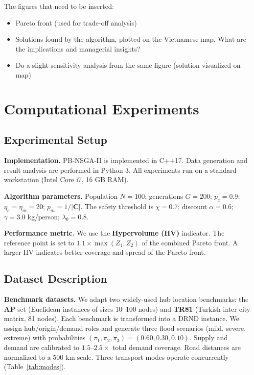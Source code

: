 \documentclass{llncs}
\begin{document}
The figures that need to be inserted:
\begin{itemize}
    \item Pareto front (used for trade-off analysis)
    \item Solutions found by the algorithm, plotted on the Vietnamese map. What are the implications and managerial insights?
    \item Do a slight sensitivity analysis from the same figure (solution visualized on map)
\end{itemize}

\section{Computational Experiments}

\subsection{Experimental Setup}

\textbf{Implementation.} PB-NSGA-II is implemented in C++17. Data generation and result analysis are performed in Python 3. All experiments run on a standard workstation (Intel Core i7, 16 GB RAM).

\textbf{Algorithm parameters.} Population $N = 100$; generations $G = 200$; $p_c = 0.9$; $\eta_c = \eta_m = 20$; $p_m = 1/|\mathbf{C}|$. The safety threshold is $\chi = 0.7$; discount $\alpha = 0.6$; $\gamma = 3.0$ kg/person; $\lambda_0 = 0.8$.

\textbf{Performance metric.} We use the \textbf{Hypervolume (HV)} indicator. The reference point is set to $1.1 \times \max(Z_1, Z_2)$ of the combined Pareto front. A larger HV indicates better coverage and spread of the Pareto front.

\subsection{Dataset Description}


\textbf{Benchmark datasets.} We adapt two widely-used hub location benchmarks: the \textbf{AP} set \cite{ap_dataset} (Euclidean instances of sizes 10--100 nodes) and \textbf{TR81} \cite{tr81_dataset} (Turkish inter-city matrix, 81 nodes). Each benchmark is transformed into a DRND instance. We assign hub/origin/demand roles and generate three flood scenarios (mild, severe, extreme) with probabilities $(\pi_1, \pi_2, \pi_3) = (0.60, 0.30, 0.10)$. Supply and demand are calibrated to $1.5$--$2.5\times$ total demand coverage. Road distances are normalized to a 500 km scale. Three transport modes operate concurrently (Table~\ref{tab:modes}).
\end{document}
